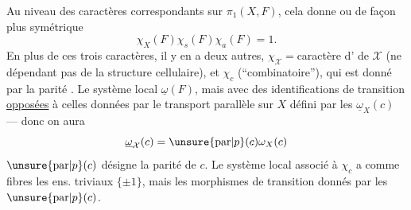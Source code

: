 Au niveau des caractères correspondants sur $\pi_1(X,F)$, cela donne
ou de façon plus symétrique
\[\chi_X(F)\chi_s(F)\chi_a(F)=1.\]
En plus de ces trois caractères, il y en a deux autres, $\chi_{\mathcal X}={}$caractère d' de $\mathcal X$ (ne dépendant pas de la structure cellulaire), et $\chi_c$ (``combinatoire''), qui est donné par la parité . Le système local   $\underline\omega(F)$, mais avec des identifications de transition \uline{opposées} à celles données par  le transport parallèle sur $X$
défini par les $\underline\omega_X(c)$ --- donc on aura
\[\underline\omega_{\mathcal X}(c)=\unsure{\mathrm{par}|p}(c)\omega_X(c)\]
 $\unsure{\mathrm{par}|p}(c)$ désigne la parité de $c$.
 Le système local associé à $\chi_c$ a  comme fibres les ens. triviaux $\{\pm1\}$, mais les morphismes de transition donnés par les $\unsure{\mathrm{par}|p}(c)$.

